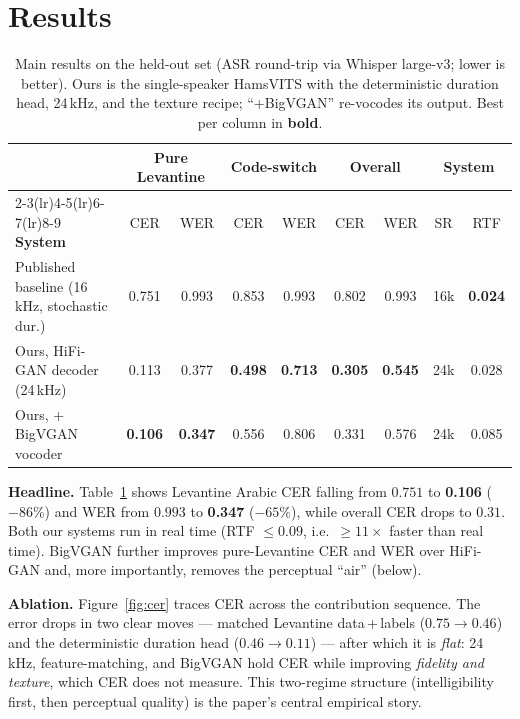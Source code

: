 \documentclass[10pt,twocolumn]{article}
\newcommand{\best}[1]{\textbf{#1}}
\begin{document}
\section{Results}
\label{sec:results}
\begin{table}[t]
\centering\small
\caption{Main results on the held-out set (ASR round-trip via Whisper large-v3; lower is
better). Ours is the single-speaker HamsVITS with the deterministic duration head, 24\,kHz,
and the texture recipe; ``+BigVGAN'' re-vocodes its output. Best per column in \best{bold}.}
\label{tab:main}
\begin{tabular}{lcc cc cc cc}
\toprule
& \multicolumn{2}{c}{\textbf{Pure Levantine}} & \multicolumn{2}{c}{\textbf{Code-switch}}
& \multicolumn{2}{c}{\textbf{Overall}} & \multicolumn{2}{c}{\textbf{System}}\\
\cmidrule(lr){2-3}\cmidrule(lr){4-5}\cmidrule(lr){6-7}\cmidrule(lr){8-9}
\textbf{System} & CER & WER & CER & WER & CER & WER & SR & RTF\\
\midrule
Published baseline (16\,kHz, stochastic dur.) & 0.751 & 0.993 & 0.853 & 0.993 & 0.802 & 0.993 & 16k & \best{0.024}\\
Ours, HiFi-GAN decoder (24\,kHz)               & 0.113 & 0.377 & \best{0.498} & \best{0.713} & \best{0.305} & \best{0.545} & 24k & 0.028\\
Ours, + BigVGAN vocoder                        & \best{0.106} & \best{0.347} & 0.556 & 0.806 & 0.331 & 0.576 & 24k & 0.085\\
\bottomrule
\end{tabular}
\end{table}

\textbf{Headline.} Table~\ref{tab:main} shows Levantine Arabic CER falling from \(0.751\) to
\best{0.106} (\(-86\%\)) and WER from \(0.993\) to \best{0.347} (\(-65\%\)), while overall CER
drops to \(0.31\). Both our systems run in real time (RTF \(\leq\!0.09\), i.e.\
\(\geq\!11\times\) faster than real time). BigVGAN further improves pure-Levantine CER and WER
over HiFi-GAN and, more importantly, removes the perceptual ``air'' (below).

\textbf{Ablation.} Figure~\ref{fig:cer} traces CER across the contribution sequence. The
error drops in two clear moves --- matched Levantine data\,+\,labels
(\(0.75\!\rightarrow\!0.46\)) and the deterministic duration head
(\(0.46\!\rightarrow\!0.11\)) --- after which it is \emph{flat}: 24\,kHz, feature-matching,
and BigVGAN hold CER while improving \emph{fidelity and texture}, which CER does not measure.
This two-regime structure (intelligibility first, then perceptual quality) is the paper's
central empirical story.
\end{document}
